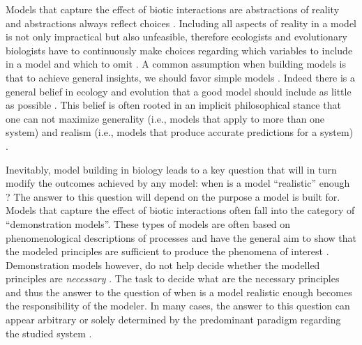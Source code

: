 \documentclass[12pt]{article}
\begin{document}
Models that capture the effect of biotic interactions are abstractions of reality and abstractions always reflect choices \citep{levins2006strategies}. Including all aspects of reality in a model is not only impractical but also unfeasible, therefore ecologists and evolutionary biologists have to continuously make choices regarding which variables to include in a model and which to omit \citep{evans2012predictive}. A common assumption when building models is that to achieve general insights, we should favor simple models \citep{evans2013simple}. Indeed there is a general belief in ecology and evolution that a good model should include as little as possible \citep{evans2013simple,orzack2012philosophy}. This belief is often rooted in an implicit philosophical stance that one can not maximize generality (i.e., models that apply to more than one system) and realism (i.e., models that produce accurate predictions for a system) \citep{levins2006strategies,evans2012predictive}.


Inevitably, model building in biology leads to a key question that will in turn modify the outcomes achieved by any model: when is a model ``realistic'' enough \citep{stouffer2019all}? The answer to this question will depend on the purpose a model is built for. Models that capture the effect of biotic interactions often fall into the category of ``demonstration models''. These types of models are often based on phenomenological descriptions of processes and have the general aim to show that the modeled principles are sufficient to produce the phenomena of interest \citep{evans2013simple}.  Demonstration models however, do not help decide whether the modelled principles are \textit{necessary} \citep{evans2013simple}. The task to decide what are the necessary principles and thus the answer to the question of when is a model realistic enough becomes the responsibility of the modeler. In many cases, the answer to this question can appear arbitrary or solely determined by the predominant paradigm regarding the studied system \citep{holland2006comment,bascompte2006response,aladwani2019addition,martyn2021identifying}.
\end{document}

